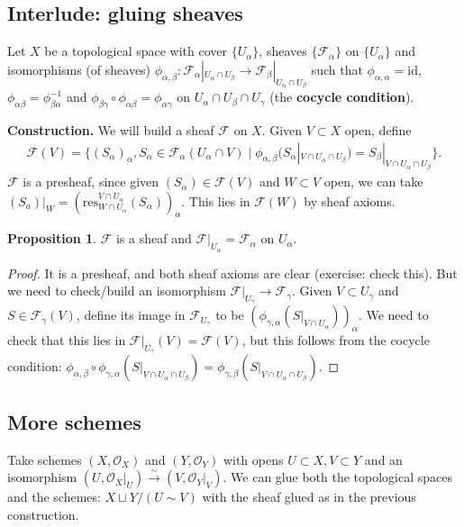 \documentclass{article}
\theoremstyle{definition}
\newtheorem{prop}[theorem]{Proposition}
\begin{document}
\subsection{Interlude: gluing sheaves}
Let $X$ be a topological space with cover $\{U_{\alpha}\}$, sheaves $\{\mathcal{F}_{\alpha}\}$ on $\{U_\alpha\}$ and isomorphisms (of sheaves) $\phi_{\alpha,\beta} : \mathcal{F}_{\alpha}|_{U_\alpha \cap U_{\beta}} \to \mathcal{F}_\beta |_{U_\alpha \cap U_\beta}$ such that $\phi_{\alpha,\alpha} = \text{id}$, $\phi_{\alpha \beta} = \phi_{\beta \alpha}^{-1}$ and $\phi_{\beta \gamma} \circ \phi_{\alpha \beta} = \phi_{\alpha \gamma}$ on $U_{\alpha} \cap U_\beta \cap U_\gamma$ (the \textbf{cocycle condition}).
\vspace{1mm}
 
\textbf{Construction.} We will build a sheaf $\mathcal{F}$ on $X$. Given $V \subset X$ open, define 
\begin{align*}
    \mathcal{F}(V) = \{(S_\alpha)_{\alpha}, S_\alpha \in \mathcal{F}_{\alpha}(U_\alpha \cap V)\mid \phi_{\alpha,\beta}(S_\alpha |_{V \cap U_\alpha \cap U_\beta}) = S_\beta|_{V \cap U_\alpha \cap U_\beta}\}.
\end{align*} 
$\mathcal{F}$ is a presheaf, since given $(S_\alpha) \in \mathcal{F}(V)$ and $W \subset V$ open, we can take $(S_a)|_W = \left(\text{res}^{V \cap U_\alpha}_{W \cap U_\alpha}(S_\alpha)\right)_\alpha$. This lies in $\mathcal{F}(W)$ by sheaf axioms.
\begin{prop}
    $\mathcal{F}$ is a sheaf and $\mathcal{F}|_{U_\alpha} = \mathcal{F}_\alpha$ on $U_\alpha$.
\end{prop}
\begin{proof}
    It is a presheaf, and both sheaf axioms are clear (exercise: check this). But we need to check/build an isomorphism $\mathcal{F}|_{U_\gamma} \to \mathcal{F}_\gamma$. Given $V \subset U_\gamma$ and $S \in \mathcal{F}_{\gamma}(V)$, define its image in $\mathcal{F}_{U_\gamma}$ to be $(\phi_{\gamma, \alpha}(S|_{V \cap U_\alpha}))_\alpha$. We need to check that this lies in $\mathcal{F}|_{U_\gamma}(V)= \mathcal{F}(V)$, but this follows from the cocycle condition: $\phi_{\alpha,\beta} \circ \phi_{\gamma,\alpha} (S |_{V \cap U_\alpha \cap U_\beta}) = \phi_{\gamma, \beta}(S|_{V \cap U_\alpha \cap U_\beta})$.
\end{proof}
\subsection{More schemes}
Take schemes $(X, \mathcal{O}_X)$ and $(Y, \mathcal{O}_Y)$ with opens $U \subset X, V \subset Y$ and an isomorphism $(U, \mathcal{O}_X|_U) \stackrel{\sim}{\to} (V, \mathcal{O}_Y|_V)$. We can glue both the topological spaces and the schemes: $X \sqcup Y / (U \sim V)$ with the sheaf glued as in the previous construction.
\vspace{1mm}
 
\end{document}
